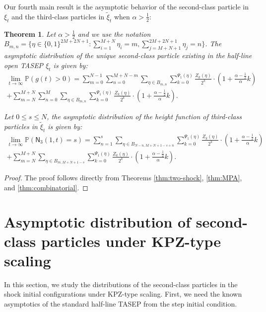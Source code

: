\documentclass[12pt,a4paper]{amsart}
\newtheorem{theorem}{Theorem} %
\theoremstyle{remark}
\numberwithin{equation}{section} \numberwithin{theorem}{section}
\begin{document}
Our fourth main result is the asymptotic behavior of the second-class particle in $\xi_t$ and the third-class particles in $\tilde{\xi}_{t}$ when $ \alpha > \frac12$:
\begin{theorem}
\label{thm:two-shocks-stationary-4.2}
Let $ \alpha > \frac12$ and we use the notation $B_{m,n}=\{\eta \in \{0,1\}^{2M+2N+1}: \sum_{i=1}^{M+N}\eta_i=m, \sum_{j=M+N+1}^{2M+2N+1}\eta_j=n\}$. The asymptotic distribution of the unique second-class particle existing in the half-line open TASEP $\xi_t$ is given by:
\begin{multline}
\label{eq:two-shocks-exist-2}
\lim_{t\to\infty}\mathbb{P}(g(t)>0)=\sum_{m=0}^{N-1}\sum_{n=0}^{M+N-m}\sum_{\eta \in B_{m,n}} \sum_{k=0}^{\Psi_{1}(\eta)} \frac{Z_k(\eta)}{2^k} \cdot \left(1+\frac{\alpha-\frac12}{\alpha}k\right)  \\
+\sum_{m=N}^{M+N}\sum_{n=0}^{M}\sum_{\eta \in B_{m,n}}\sum_{k=0}^{\Psi_{1}(\eta)} \frac{Z_k(\eta)}{2^k} \cdot \left(1+\frac{\alpha-\frac12}{\alpha}k\right).
\end{multline}

Let $0 \leq s \leq N$, the asymptotic distribution of the height function of third-class particles in $\tilde{\xi}_t$ is given by:
\begin{multline}
\label{eq:two-shocks-height-2}
\lim_{t\to\infty}\mathbb{P}(\mathsf{N}_{3} (1,t)=s)=\sum_{n=1}^{s}\sum_{\eta \in B_{N-n,M+N+1-s+n}} \sum_{k=0}^{\Psi_{1}(\eta)} \frac{Z_k(\eta)}{2^k} \cdot \left(1+\frac{\alpha-\frac12}{\alpha}k\right)  \\
+\sum_{m=N}^{M+N}\sum_{\eta \in B_{m,M+N+1-s}}\sum_{k=0}^{\Psi_{1}(\eta)} \frac{Z_k(\eta)}{2^k} \cdot \left(1+\frac{\alpha-\frac12}{\alpha}k\right).
\end{multline}
\end{theorem}

\begin{proof}
The proof follows directly from Theorems \ref{thm:two-shock}, \ref{thm:MPA}, and \ref{thm:combinatorial}.
\end{proof}



\section{Asymptotic distribution of second-class particles under KPZ-type scaling}
\label{sec:KPZ-scaling}
In this section, we study the distributions of the second-class particles in the shock initial configurations under KPZ-type scaling. First, we need the known asymptotics of the standard half-line TASEP from the step initial condition.
\end{document}
